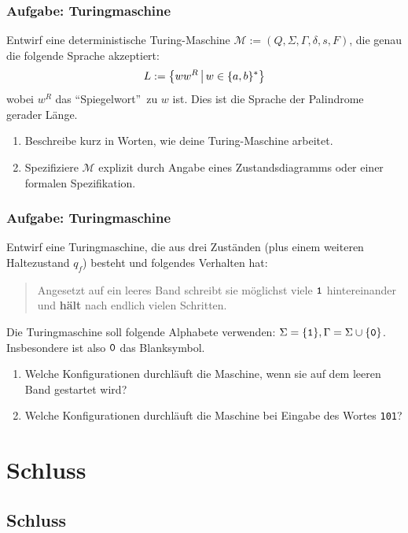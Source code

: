 \begin{frame}
\frametitle{Aufgabe: Turingmaschine}
Entwirf eine deterministische Turing-Maschine $\mathcal M := (Q, \Sigma, \Gamma, \delta, s, F)$, die genau die folgende Sprache akzeptiert: $$L:=\left\lbrace ww^R \,\middle\vert\,  w \in \{a, b\}^* \right\rbrace$$ wobei $w^R$ das "`Spiegelwort"'~zu $w$ ist.
Dies ist die Sprache der Palindrome gerader Länge.

\begin{enumerate}
	\item Beschreibe kurz in Worten, wie deine Turing-Maschine arbeitet.
	\item Spezifiziere $\mathcal M$ explizit durch Angabe eines Zustandsdiagramms oder einer formalen Spezifikation.
\end{enumerate}
\end{frame}
\begin{frame}
\frametitle{Aufgabe: Turingmaschine}
 \label{sec:busy_beaver}

Entwirf eine Turingmaschine, die aus drei Zuständen (plus einem
weiteren Haltezustand $q_f$) besteht und folgendes Verhalten hat:
\begin{quote}
  Angesetzt auf ein leeres Band schreibt sie möglichst viele ${\tt 1}$
  hintereinander und \textbf{hält} nach endlich vielen Schritten.
\end{quote}
Die Turingmaschine soll folgende Alphabete verwenden: $\Sigma = \{{\tt 1}\},
\Gamma = \Sigma \cup \{{\tt 0}\}$.  Insbesondere ist also ${\tt 0}$ das
Blanksymbol.

\begin{enumerate}
	\item Welche Konfigurationen durchläuft die Maschine, wenn sie auf dem leeren Band gestartet wird?
	\item Welche Konfigurationen durchläuft die Maschine bei Eingabe
des Wortes {\tt 101}?
\end{enumerate}
\end{frame}

\section{Schluss}
\subsection{Schluss}

